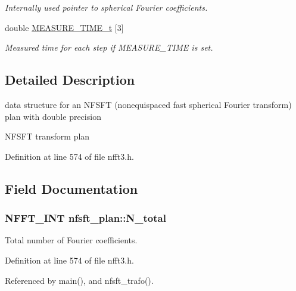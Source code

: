 \begin{DoxyCompactItemize}
\begin{DoxyCompactList}\small\item\em Internally used pointer to spherical Fourier coefficients. \end{DoxyCompactList}\item 
\hypertarget{structnfsft__plan_ae22ba52a7e414e15dc662c8ee2b5f2db}{double \hyperlink{structnfsft__plan_ae22ba52a7e414e15dc662c8ee2b5f2db}{M\-E\-A\-S\-U\-R\-E\-\_\-\-T\-I\-M\-E\-\_\-t} \mbox{[}3\mbox{]}}\label{structnfsft__plan_ae22ba52a7e414e15dc662c8ee2b5f2db}

\begin{DoxyCompactList}\small\item\em Measured time for each step if M\-E\-A\-S\-U\-R\-E\-\_\-\-T\-I\-M\-E is set. \end{DoxyCompactList}\end{DoxyCompactItemize}


\subsection{Detailed Description}
data structure for an N\-F\-S\-F\-T (nonequispaced fast spherical Fourier transform) plan with double precision 

N\-F\-S\-F\-T transform plan 

Definition at line 574 of file nfft3.\-h.



\subsection{Field Documentation}
\hypertarget{structnfsft__plan_a0a36dfca8351c262e37dbdd766b1ec52}{
\subsubsection[{N\-\_\-total}]{\setlength{\rightskip}{0pt plus 5cm}N\-F\-F\-T\-\_\-\-I\-N\-T nfsft\-\_\-plan\-::\-N\-\_\-total}}\label{structnfsft__plan_a0a36dfca8351c262e37dbdd766b1ec52}


Total number of Fourier coefficients. 



Definition at line 574 of file nfft3.\-h.



Referenced by main(), and nfsft\-\_\-trafo().

